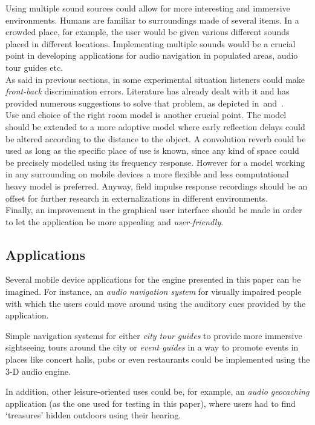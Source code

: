 \documentclass[journal]{IEEEtran}
\begin{document}
Using multiple sound sources could allow for more interesting and immersive environments. Humans are familiar to surroundings made of several items. In a crowded place, for example, the user would be given various different sounds placed in different locations. Implementing multiple sounds would be a crucial point in developing applications for audio navigation in populated areas, audio tour guides etc.\\
As said in previous sections, in some experimental situation listeners could make \emph{front-back} discrimination errors. Literature has already dealt with it and has provided numerous suggestions to solve that problem, as depicted in~\cite{blum2012}and~\cite{wightman1999}.\\
Use and choice of the right room model is another crucial point. The model should be extended to a more adoptive model where early reflection delays could be altered according to the distance to the object. A convolution reverb could be used as long as the specific place of use is known, since any kind of space could be precisely modelled using its frequency response. However for a model working in any surrounding on mobile devices a more flexible and less computational heavy model is preferred. Anyway, field impulse response recordings should be an offset for further research in externalizations in different environments.\\
Finally, an improvement in the graphical user interface should be made in order to let the application be more appealing and \emph{user-friendly}.

\subsection{Applications}
Several mobile device applications for the engine presented in this paper can be imagined. For instance, an \textit{audio navigation system} for visually impaired people with which the users could move around using the auditory cues provided by the application.

Simple navigation systems for either \textit{city tour guides} to provide more immersive sightseeing tours around the city or \textit{event guides} in a way to promote events in places like concert halls, pubs or even restaurants could be implemented using the 3-D audio engine.

In addition, other leisure-oriented uses could be, for example, an \textit{audio geocaching} application (as the one used for testing in this paper), where users had to find `treasures' hidden outdoors using their hearing.
\end{document}
